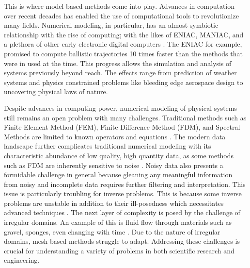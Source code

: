 This is where model based methods come into play. Advances in computation over recent decades has enabled the use of computational tools to revolutionize many fields. Numerical modeling, in particular, has an almost symbiotic relationship with the rise of computing; with the likes of ENIAC, MANIAC, and a plethora of other early electronic digital computers \autocite{andersonScientificUsesMANIAC1986}. The ENIAC for example, promised to compute ballistic trajectories 10 times faster than the methods that were in used at the time. This progress allows the simulation and analysis of systems previously beyond reach. The effects range from prediction of weather systems and physics constrained problems like bleeding edge aerospace design to uncovering physical laws of nature.

Despite advances in computing power, numerical modeling of physical systems still remains an open problem with many challenges. Traditional methods such as Finite Element Method (FEM), Finite Difference Method (FDM), and Spectral Methods are limited to known operators and equations \autocite{karniadakisPhysicsinformedMachineLearning2021, du2024neural,fanaskovSpectralNeuralOperators2023,luLearningNonlinearOperators2021}. The modern data landscape further complicates traditional numerical modeling with its characteristic abundance of low quality, high quantity data, as some methods such as FDM are inherently sensitive to noise \autocite{dearagaoExplicitControlNumerical2021, huntulInverseProblemReconstructing2021}. Noisy data also presents a formidable challenge in general because gleaning any meaningful information from noisy and incomplete data requires further filtering and interpretation. This issue is particularly troubling for inverse problems. This is because some inverse problems are unstable in addition to their ill-posedness which necessitates advanced techniques \autocite{caubetInstabilityInverseProblem2013, mandacheExponentialInstabilityInverse2001}. The next layer of complexity is posed by the challenge of irregular domains. An example of this is fluid flow through materials such as gravel, sponges, even changing with time \autocite{liImmersedInterfaceMethod2006}. Due to the nature of irregular domains, mesh based methods struggle to adapt. Addressing these challenges is crucial for understanding a variety of problems in both scientific research and engineering.


